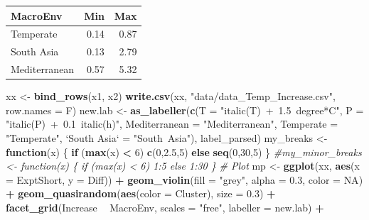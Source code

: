 \documentclass[
]{article}
\newenvironment{Shaded}{\begin{snugshade}}{\end{snugshade}}
\newcommand{\CommentTok}[1]{\textcolor[rgb]{0.56,0.35,0.01}{\textit{#1}}}
\newcommand{\ControlFlowTok}[1]{\textcolor[rgb]{0.13,0.29,0.53}{\textbf{#1}}}
\newcommand{\DataTypeTok}[1]{\textcolor[rgb]{0.13,0.29,0.53}{#1}}
\newcommand{\DecValTok}[1]{\textcolor[rgb]{0.00,0.00,0.81}{#1}}
\newcommand{\FloatTok}[1]{\textcolor[rgb]{0.00,0.00,0.81}{#1}}
\newcommand{\KeywordTok}[1]{\textcolor[rgb]{0.13,0.29,0.53}{\textbf{#1}}}
\newcommand{\NormalTok}[1]{#1}
\newcommand{\OperatorTok}[1]{\textcolor[rgb]{0.81,0.36,0.00}{\textbf{#1}}}
\newcommand{\OtherTok}[1]{\textcolor[rgb]{0.56,0.35,0.01}{#1}}
\newcommand{\StringTok}[1]{\textcolor[rgb]{0.31,0.60,0.02}{#1}}
\begin{document}
\begin{longtable}[]{@{}lrr@{}}
\toprule
MacroEnv & Min & Max\tabularnewline
\midrule
\endhead
Temperate & 0.14 & 0.87\tabularnewline
South Asia & 0.13 & 2.79\tabularnewline
Mediterranean & 0.57 & 5.32\tabularnewline
\bottomrule
\end{longtable}

\begin{Shaded}
\begin{Highlighting}[]
\NormalTok{xx <-}\StringTok{ }\KeywordTok{bind_rows}\NormalTok{(x1, x2)}
\KeywordTok{write.csv}\NormalTok{(xx, }\StringTok{"data/data_Temp_Increase.csv"}\NormalTok{, }\DataTypeTok{row.names =}\NormalTok{ F)}
\NormalTok{new.lab <-}\StringTok{ }\KeywordTok{as_labeller}\NormalTok{(}\KeywordTok{c}\NormalTok{(}\DataTypeTok{T =} \StringTok{"italic(T)~+~1.5~degree*C"}\NormalTok{, }\DataTypeTok{P =} \StringTok{"italic(P)~+~0.1~italic(h)"}\NormalTok{,}
    \DataTypeTok{Mediterranean =} \StringTok{"Mediterranean"}\NormalTok{, }\DataTypeTok{Temperate =} \StringTok{"Temperate"}\NormalTok{, }
    \StringTok{`}\DataTypeTok{South Asia}\StringTok{`}\NormalTok{ =}\StringTok{ "South~Asia"}\NormalTok{), label_parsed)}
\NormalTok{my_breaks <-}\StringTok{ }\ControlFlowTok{function}\NormalTok{(x) \{ }\ControlFlowTok{if}\NormalTok{ (}\KeywordTok{max}\NormalTok{(x) }\OperatorTok{<}\StringTok{ }\DecValTok{6}\NormalTok{) }\KeywordTok{c}\NormalTok{(}\DecValTok{0}\NormalTok{,}\FloatTok{2.5}\NormalTok{,}\DecValTok{5}\NormalTok{) }\ControlFlowTok{else} \KeywordTok{seq}\NormalTok{(}\DecValTok{0}\NormalTok{,}\DecValTok{30}\NormalTok{,}\DecValTok{5}\NormalTok{) \}}
\CommentTok{#my_minor_breaks <- function(x) \{ if (max(x) < 6) 1:5 else 1:30 \}}
\CommentTok{# Plot }
\NormalTok{mp <-}\StringTok{ }\KeywordTok{ggplot}\NormalTok{(xx, }\KeywordTok{aes}\NormalTok{(}\DataTypeTok{x =}\NormalTok{ ExptShort, }\DataTypeTok{y =}\NormalTok{ Diff)) }\OperatorTok{+}\StringTok{ }
\StringTok{  }\KeywordTok{geom_violin}\NormalTok{(}\DataTypeTok{fill =} \StringTok{"grey"}\NormalTok{, }\DataTypeTok{alpha =} \FloatTok{0.3}\NormalTok{, }\DataTypeTok{color =} \OtherTok{NA}\NormalTok{) }\OperatorTok{+}\StringTok{ }
\StringTok{  }\KeywordTok{geom_quasirandom}\NormalTok{(}\KeywordTok{aes}\NormalTok{(}\DataTypeTok{color =}\NormalTok{ Cluster), }\DataTypeTok{size =} \FloatTok{0.3}\NormalTok{) }\OperatorTok{+}\StringTok{ }
\StringTok{  }\KeywordTok{facet_grid}\NormalTok{(Increase }\OperatorTok{~}\StringTok{ }\NormalTok{MacroEnv, }\DataTypeTok{scales =} \StringTok{"free"}\NormalTok{, }\DataTypeTok{labeller =}\NormalTok{ new.lab) }\OperatorTok{+}\StringTok{ }

\end{Highlighting}
\end{Shaded}
\end{document}

